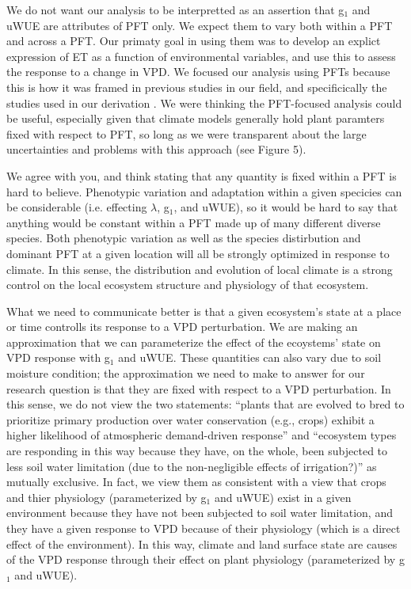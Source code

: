 We do not want our analysis to be interpretted as an assertion that
g$_1$ and uWUE are attributes of PFT only. We expect them to vary both
within a PFT and across a PFT. Our primaty goal in using them was to
develop an explict expression of ET as a function of environmental
variables, and use this to assess the response to a change in VPD. We
focused our analysis using PFTs because this is how it was framed in
previous studies in our field, and specificically the studies used in
our derivation \citep{Zhou_2014, Zhou_2015, Medlyn_2017}. We were
thinking the PFT-focused analysis could be useful, especially given
that climate models generally hold plant paramters fixed with respect
to PFT, so long as we were transparent about the large uncertainties
and problems with this approach (see Figure 5).

We agree with you, and think stating that any quantity is fixed within
a PFT is hard to believe. Phenotypic variation and adaptation within a
given specicies can be considerable (i.e. effecting $\lambda$, g$_1$,
and uWUE), so it would be hard to say that anything would be constant
within a PFT made up of many different diverse species. Both
phenotypic variation as well as the species distirbution and dominant
PFT at a given location will all be strongly optimized in response to
climate. In this sense, the distribution and evolution of local
climate is a strong control on the local ecosystem structure and
physiology of that ecosystem.

What we need to communicate better is that a given ecosystem's state
at a place or time controlls its response to a VPD perturbation. We
are making an approximation that we can parameterize the effect of the
ecoystems' state on VPD response with g$_1$ and uWUE. These quantities
can also vary due to soil moisture condition; the approximation we
need to make to answer for our research question is that they are
fixed with respect to a VPD perturbation. In this sense, we do not
view the two statements: ``plants that are evolved to bred to
prioritize primary production over water conservation (e.g., crops)
exhibit a higher likelihood of atmospheric demand-driven response''
and ``ecosystem types are responding in this way because they have, on
the whole, been subjected to less soil water limitation (due to the
non-negligible effects of irrigation?)'' as mutually exclusive. In
fact, we view them as consistent with a view that crops and thier
physiology (parameterized by g$_1$ and uWUE) exist in a given
environment because they have not been subjected to soil water
limitation, and they have a given response to VPD because of their
physiology (which is a direct effect of the environment). In this way,
climate and land surface state are causes of the VPD response through
their effect on plant physiology (parameterized by g$_1$ and uWUE).

